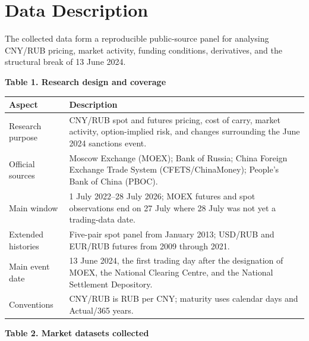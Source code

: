 \documentclass[11pt,a4paper]{article}
\begin{document}
\footnotesize

\section*{Data Description}

The collected data form a reproducible public-source panel for analysing CNY/RUB pricing, market activity, funding conditions, derivatives, and the structural break of 13 June 2024.

\textbf{Table 1. Research design and coverage}

\begin{tabularx}{\textwidth}{@{}p{}Y@{}}
\toprule
\textbf{Aspect} & \textbf{Description} \\
\midrule
Research purpose & CNY/RUB spot and futures pricing, cost of carry, market activity, option-implied risk, and changes surrounding the June 2024 sanctions event. \\
Official sources & Moscow Exchange (MOEX); Bank of Russia; China Foreign Exchange Trade System (CFETS/ChinaMoney); People's Bank of China (PBOC). \\
Main window & 1 July 2022--28 July 2026; MOEX futures and spot observations end on 27 July where 28 July was not yet a trading-data date. \\
Extended histories & Five-pair spot panel from January 2013; USD/RUB and EUR/RUB futures from 2009 through 2021. \\
Main event date & 13 June 2024, the first trading day after the designation of MOEX, the National Clearing Centre, and the National Settlement Depository. \\
Conventions & CNY/RUB is RUB per CNY; maturity uses calendar days and Actual/365 years. \\
\bottomrule
\end{tabularx}

\textbf{Table 2. Market datasets collected}
\end{document}
